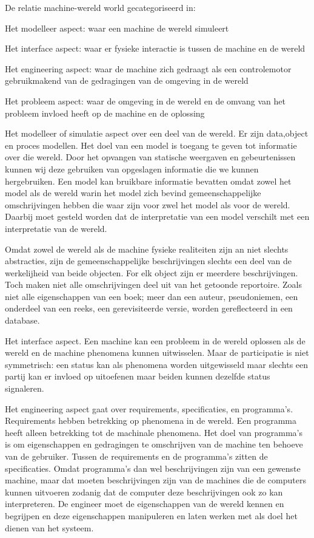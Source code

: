 De relatie machine-wereld world gecategoriseerd in: 

Het modelleer aspect: waar een machine de wereld simuleert 

Het interface aspect: waar er fysieke interactie is tussen de machine en de wereld 

Het engineering aspect: waar de machine zich gedraagt als een controlemotor gebruikmakend van de gedragingen van de omgeving in de wereld 

Het probleem aspect: waar de omgeving in de wereld en de omvang van het probleem invloed heeft op de machine en de oplossing 

Het modelleer  of simulatie aspect over een deel van de wereld. Er zijn data,object en proces modellen. Het doel van een model is toegang te geven tot informatie over die wereld. Door het opvangen van statische weergaven en gebeurtenissen kunnen wij deze gebruiken van opgeslagen informatie die we kunnen hergebruiken. Een model kan bruikbare informatie bevatten omdat zowel het model als de wereld warin het model zich bevind gemeenschappelijke omschrijvingen hebben die waar zijn voor zwel het model als voor de wereld. Daarbij moet gesteld worden dat de interpretatie van een model verschilt met een interpretatie van de wereld. 

Omdat zowel de wereld als de machine fysieke realiteiten zijn an niet slechts abstracties, zijn de gemeenschappelijke beschrijvingen slechts een deel van de werkelijheid van beide objecten. For elk object zijn er meerdere beschrijvingen. Toch maken niet alle omschrijvingen deel uit van het getoonde reportoire. Zoals niet alle eigenschappen van een boek; meer dan een auteur, pseudoniemen, een onderdeel van een reeks, een gerevisiteerde versie, worden gereflecteerd in een database.  

Het interface aspect. Een machine kan een probleem in de wereld oplossen als de wereld en de machine phenomena kunnen uitwisselen. Maar de participatie is niet symmetrisch: een status kan als phenomena worden uitgewisseld maar slechts een partij kan er invloed op uitoefenen maar beiden kunnen dezelfde status signaleren. 

Het engineering aspect gaat over requirements, specificaties, en programma’s. Requirements hebben betrekking op phenomena in de wereld. Een programma heeft alleen betrekking tot de machinale phenomena. Het doel van programma’s is om eigenschappen en gedragingen te omschrijven van de machine ten behoeve van de gebruiker. Tussen de requirements en de programma’s zitten de specificaties. Omdat programma’s dan wel beschrijvingen zijn van een gewenste machine, maar dat moeten beschrijvingen zijn van de  machines  die de computers kunnen uitvoeren zodanig dat de computer deze beschrijvingen ook zo kan interpreteren. De engineer moet  de eigenschappen van de wereld kennen en begrijpen en deze eigenschappen manipuleren en laten werken met als doel het dienen van het systeem. 

